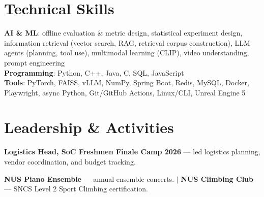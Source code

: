 \documentclass[letterpaper,10pt]{article}
\begin{document}
\section{Technical Skills}

\vspace*{3pt}

\begin{itemize}[leftmargin=0.15in, label={}, itemsep=2pt,
                topsep=0pt, partopsep=0pt, parsep=0pt]
  \small{\item{
    \textbf{AI \& ML}{: offline evaluation \& metric design, statistical experiment design,
    information retrieval (vector search, RAG, retrieval corpus construction),
    LLM agents (planning, tool use), multimodal learning (CLIP), video understanding,
    prompt engineering} \\[2pt]
    \textbf{Programming}{: Python, C++, Java, C, SQL, JavaScript} \\[2pt]
    \textbf{Tools}{: PyTorch, FAISS, vLLM, NumPy, Spring Boot, Redis, MySQL, Docker,
    Playwright, async Python, Git/GitHub Actions, Linux/CLI, Unreal Engine 5}
  }}
\end{itemize}

\vspace*{4pt}


\section{Leadership \& Activities}

\vspace*{3pt}

\begin{itemize}[leftmargin=0.15in, label={}, itemsep=2pt,
                topsep=0pt, partopsep=0pt, parsep=0pt]

  \small{\item{
    \textbf{Logistics Head, SoC Freshmen Finale Camp 2026} ---
    led logistics planning, vendor coordination, and budget tracking.
  }}

  \small{\item{
    \textbf{NUS Piano Ensemble} --- annual ensemble concerts.
    $|$
    \textbf{NUS Climbing Club} --- SNCS Level 2 Sport Climbing certification.
  }}

  

\end{itemize}

\end{document}
